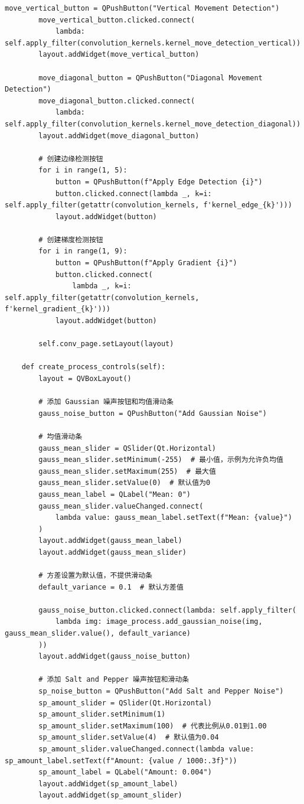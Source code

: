 \documentclass[a4paper,12pt]{article}
\begin{document}
\begin{lstlisting}[style=python]
        move_vertical_button = QPushButton("Vertical Movement Detection")
        move_vertical_button.clicked.connect(
            lambda: self.apply_filter(convolution_kernels.kernel_move_detection_vertical))
        layout.addWidget(move_vertical_button)

        move_diagonal_button = QPushButton("Diagonal Movement Detection")
        move_diagonal_button.clicked.connect(
            lambda: self.apply_filter(convolution_kernels.kernel_move_detection_diagonal))
        layout.addWidget(move_diagonal_button)

        # 创建边缘检测按钮
        for i in range(1, 5):
            button = QPushButton(f"Apply Edge Detection {i}")
            button.clicked.connect(lambda _, k=i: self.apply_filter(getattr(convolution_kernels, f'kernel_edge_{k}')))
            layout.addWidget(button)

        # 创建梯度检测按钮
        for i in range(1, 9):
            button = QPushButton(f"Apply Gradient {i}")
            button.clicked.connect(
                lambda _, k=i: self.apply_filter(getattr(convolution_kernels, f'kernel_gradient_{k}')))
            layout.addWidget(button)

        self.conv_page.setLayout(layout)

    def create_process_controls(self):
        layout = QVBoxLayout()

        # 添加 Gaussian 噪声按钮和均值滑动条
        gauss_noise_button = QPushButton("Add Gaussian Noise")

        # 均值滑动条
        gauss_mean_slider = QSlider(Qt.Horizontal)
        gauss_mean_slider.setMinimum(-255)  # 最小值，示例为允许负均值
        gauss_mean_slider.setMaximum(255)  # 最大值
        gauss_mean_slider.setValue(0)  # 默认值为0
        gauss_mean_label = QLabel("Mean: 0")
        gauss_mean_slider.valueChanged.connect(
            lambda value: gauss_mean_label.setText(f"Mean: {value}")
        )
        layout.addWidget(gauss_mean_label)
        layout.addWidget(gauss_mean_slider)

        # 方差设置为默认值，不提供滑动条
        default_variance = 0.1  # 默认方差值

        gauss_noise_button.clicked.connect(lambda: self.apply_filter(
            lambda img: image_process.add_gaussian_noise(img, gauss_mean_slider.value(), default_variance)
        ))
        layout.addWidget(gauss_noise_button)

        # 添加 Salt and Pepper 噪声按钮和滑动条
        sp_noise_button = QPushButton("Add Salt and Pepper Noise")
        sp_amount_slider = QSlider(Qt.Horizontal)
        sp_amount_slider.setMinimum(1)
        sp_amount_slider.setMaximum(100)  # 代表比例从0.01到1.00
        sp_amount_slider.setValue(4)  # 默认值为0.04
        sp_amount_slider.valueChanged.connect(lambda value: sp_amount_label.setText(f"Amount: {value / 1000:.3f}"))
        sp_amount_label = QLabel("Amount: 0.004")
        layout.addWidget(sp_amount_label)
        layout.addWidget(sp_amount_slider)


\end{lstlisting}
\end{document}
